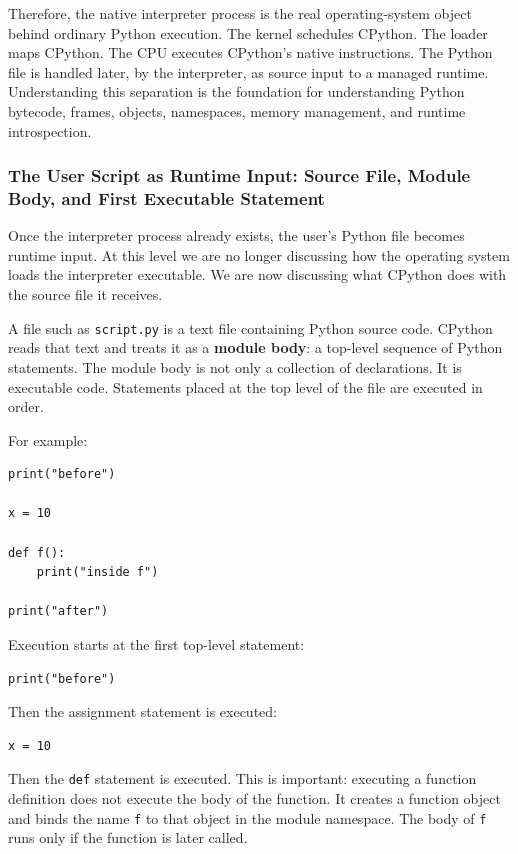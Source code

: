 \documentclass[a4paper,twoside]{report}
\begin{document}
Therefore, the native interpreter process is the real operating-system object behind ordinary Python execution. The kernel schedules CPython. The loader maps CPython. The CPU executes CPython's native instructions. The Python file is handled later, by the interpreter, as source input to a managed runtime. Understanding this separation is the foundation for understanding Python bytecode, frames, objects, namespaces, memory management, and runtime introspection.



\subsubsection{The User Script as Runtime Input: Source File, Module Body, and First Executable Statement}

Once the interpreter process already exists, the user's Python file becomes runtime input. At this level we are no longer discussing how the operating system loads the interpreter executable. We are now discussing what CPython does with the source file it receives.

A file such as \texttt{script.py} is a text file containing Python source code. CPython reads that text and treats it as a \textbf{module body}: a top-level sequence of Python statements. The module body is not only a collection of declarations. It is executable code. Statements placed at the top level of the file are executed in order.

For example:

\begin{verbatim}
print("before")

x = 10

def f():
    print("inside f")

print("after")
\end{verbatim}

Execution starts at the first top-level statement:

\begin{verbatim}
print("before")
\end{verbatim}

Then the assignment statement is executed:

\begin{verbatim}
x = 10
\end{verbatim}

Then the \texttt{def} statement is executed. This is important: executing a function definition does not execute the body of the function. It creates a function object and binds the name \texttt{f} to that object in the module namespace. The body of \texttt{f} runs only if the function is later called.
\end{document}

